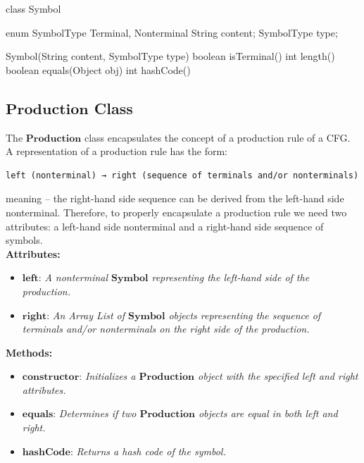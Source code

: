 \begin{codeblock}
    class Symbol {
        enum SymbolType {
            Terminal, Nonterminal
        }
        String content;
        SymbolType type;

        Symbol(String content, SymbolType type) {}
        boolean isTerminal() {}
        int length() {}
        boolean equals(Object obj) {}
        int hashCode() {}
    }
\end{codeblock}

\vspace{10pt}

\subsection{\(\boldsymbol{Production}\) Class}

The \(\boldsymbol{Production}\) class encapsulates the concept of a production rule of a CFG. A representation of a production rule has the form:

\begin{verbatim}
left (nonterminal) → right (sequence of terminals and/or nonterminals)
\end{verbatim}

meaning – the right-hand side sequence can be derived from the left-hand side nonterminal. Therefore, to properly encapsulate a production rule we need two attributes: a left-hand side nonterminal and a right-hand side sequence of symbols.\\


\textbf{Attributes:}
\begin{itemize}
    \item \(\boldsymbol{left}\): \textit{A nonterminal \(\boldsymbol{Symbol}\) representing the left-hand side of the production.}
    \item \(\boldsymbol{right}\): \textit{An Array List of \(\boldsymbol{Symbol}\) objects representing the sequence of terminals and/or nonterminals on the right side of the production.}
\end{itemize}

\textbf{Methods:}
\begin{itemize}
    \item \(\boldsymbol{constructor}\): \textit{Initializes a \(\boldsymbol{Production}\) object with the specified left and right attributes.}
    \item \(\boldsymbol{equals}\): \textit{Determines if two \(\boldsymbol{Production}\) objects are equal in both left and right.}
    \item \(\boldsymbol{hashCode}\): \textit{Returns a hash code of the symbol.}
\end{itemize}

